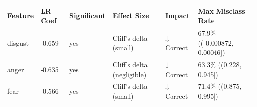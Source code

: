 \begin{tabular}{llllll}
\toprule
Feature & LR Coef & Significant & Effect Size & Impact & Max Misclass Rate \\
\midrule
disgust & -0.659 & yes & Cliff's delta (small) & ↓ Correct & 67.9\% ((-0.000872, 0.00046]) \\
anger & -0.635 & yes & Cliff's delta (negligible) & ↓ Correct & 63.3\% ((0.228, 0.945]) \\
fear & -0.566 & yes & Cliff's delta (small) & ↓ Correct & 71.4\% ((0.875, 0.995]) \\
\bottomrule
\end{tabular}
